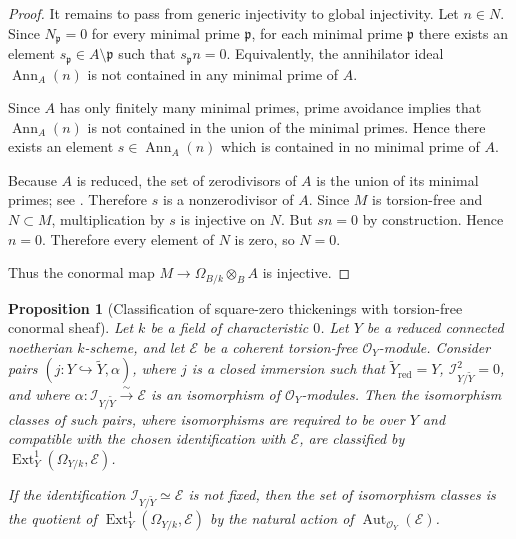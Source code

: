 \documentclass[11pt,twoside]{amsart}
\theoremstyle{plain}
\numberwithin{equation}{section}
\newtheorem{proposition}[theorem]{Proposition}
\theoremstyle{definition}
\begin{document}
\begin{proof}
It remains to pass from generic injectivity to global injectivity. Let \(n\in N\). Since
\(N_{\mathfrak p}=0\) for every minimal prime \(\mathfrak p\), for each minimal prime
\(\mathfrak p\) there exists an element \(s_{\mathfrak p}\in A\setminus \mathfrak p\)
such that \(s_{\mathfrak p}n=0\). Equivalently, the annihilator ideal
\(\operatorname{Ann}_A(n)\) is not contained in any minimal prime of \(A\).

Since \(A\) has only finitely many minimal primes, prime avoidance
\cite[Algebra, Lemma 10.15.2]{stacks-project} implies that \(\operatorname{Ann}_A(n)\)
is not contained in the union of the minimal primes. Hence there exists an element
\(s\in \operatorname{Ann}_A(n)\) which is contained in no minimal prime of \(A\).

Because \(A\) is reduced, the set of zerodivisors of \(A\) is the union of its minimal
primes; see \cite[Algebra, Lemma 10.25.2]{stacks-project}. Therefore \(s\) is a
nonzerodivisor of \(A\). Since \(M\) is torsion-free and \(N\subset M\), multiplication by
\(s\) is injective on \(N\). But \(sn=0\) by construction. Hence \(n=0\). Therefore every
element of \(N\) is zero, so \(N=0\).

Thus the conormal map \(M\to \Omega_{B/k}\otimes_B A\) is injective.
\end{proof}

\begin{proposition}[Classification of square-zero thickenings with torsion-free conormal sheaf]
\label{prop:classification-square-zero-thickenings}
Let \(k\) be a field of characteristic \(0\). Let \(Y\) be a reduced connected
noetherian \(k\)-scheme, and let \(\mathcal E\) be a coherent torsion-free
\(\mathcal O_Y\)-module. Consider pairs \((j:Y\hookrightarrow \widetilde Y,\alpha)\),
where \(j\) is a closed immersion such that \(\widetilde Y_{\mathrm{red}}=Y\),
\(\mathcal I_{Y/\widetilde Y}^{2}=0\), and where
\(\alpha:\mathcal I_{Y/\widetilde Y}\xrightarrow{\sim}\mathcal E\)
is an isomorphism of \(\mathcal O_Y\)-modules. Then the isomorphism classes of such pairs,
where isomorphisms are required to be over \(Y\) and compatible with the chosen
identification with \(\mathcal E\), are classified by
\(\operatorname{Ext}^{1}_{Y}(\Omega_{Y/k},\mathcal E)\).

If the identification \(\mathcal I_{Y/\widetilde Y}\simeq\mathcal E\) is not fixed, then the
set of isomorphism classes is the quotient of
\(\operatorname{Ext}^{1}_{Y}(\Omega_{Y/k},\mathcal E)\) by the natural action of
\(\operatorname{Aut}_{\mathcal O_Y}(\mathcal E)\).
\end{proposition}
\end{document}
